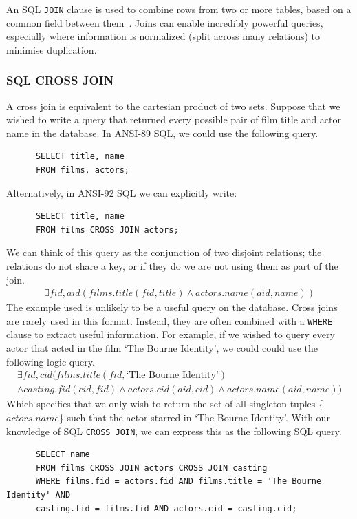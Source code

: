 \documentclass[a4paper, 11pt]{article}
\begin{document}
    An SQL \texttt{JOIN} clause is used to combine rows from two or more tables,
    based on a common field between them~\cite{w3JOINS}. Joins can enable
    incredibly powerful queries, especially where information is normalized
    (split across many relations) to minimise duplication.

    \subsubsection{SQL CROSS JOIN}
      A cross join is equivalent to the cartesian product of two sets. Suppose
      that we wished to write a query that returned every possible pair of
      film title and actor name in the database. In ANSI-89 SQL, we could use
      the following query.
      \begin{verbatim}
      SELECT title, name
      FROM films, actors;
      \end{verbatim}
      Alternatively, in ANSI-92 SQL we can explicitly write:
      \begin{verbatim}
      SELECT title, name
      FROM films CROSS JOIN actors;
      \end{verbatim}
      We can think of this query as the conjunction of two disjoint relations;
      the relations do not share a key, or if they do we are not using them as
      part of the join.
      \begin{gather}
        \exists fid, aid(films.title(fid, title) \land actors.name(aid, name))
      \end{gather}
      The example used is unlikely to be a useful query on the database. Cross
      joins are rarely used in this format. Instead, they are often combined
      with a \texttt{WHERE} clause to extract useful information. For example,
      if we wished to query every actor that acted in the film `The Bourne
      Identity', we could could use the following logic query.
      \begin{multline}
        \exists fid,cid(films.title(fid, \text{`The Bourne Identity'}) \\
        \land casting.fid(cid, fid) \land actors.cid(aid, cid) \land
          actors.name(aid, name))
      \end{multline}
      Which specifies that we only wish to return the set of all singleton
      tuples \{$actors.name$\} such that the actor starred in `The Bourne
      Identity'. With our knowledge of SQL \texttt{CROSS JOIN}, we can express
      this as the following SQL query.
      \begin{verbatim}
      SELECT name
      FROM films CROSS JOIN actors CROSS JOIN casting
      WHERE films.fid = actors.fid AND films.title = 'The Bourne Identity' AND
      casting.fid = films.fid AND actors.cid = casting.cid;
      \end{verbatim}
\end{document}
